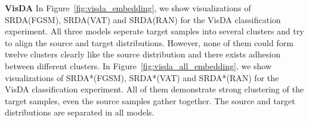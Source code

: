 \documentclass[10pt,twocolumn,letterpaper]{article}
\begin{document}
\begin{figure*}[h]
  \centering
\caption{T-SNE plots of SRDA which performed optimization in the feature space for VisDA classification experiment. Blue points denotes source samples whereas red points denotes target samples.}
  \label{fig:visda_embedding} \end{figure*}

\begin{figure*}[h]
  \centering
\caption{T-SNE plots of SRDA which performed optimization in the image level for VisDA classification experiment. Blue points denotes source samples whereas red points denotes target samples.}
  \label{fig:visda_all_embedding} \end{figure*} 

{\bf VisDA} In Figure~\ref{fig:visda_embedding}, we show visualizations of SRDA(FGSM), SRDA(VAT) and SRDA(RAN) for the VisDA classification experiment. All three models seperate target samples into several clusters and try to align the source and target distributions. However, none of them could form twelve clusters clearly like the source distribution and there exists adhesion between different clusters. In Figure~\ref{fig:visda_all_embedding}, we show visualizations of SRDA*(FGSM), SRDA*(VAT) and SRDA*(RAN) for the VisDA classification experiment. All of them demonstrate strong clustering of the target samples, even the source samples gather together. The source and target distributions are separated in all models.
\end{document}

